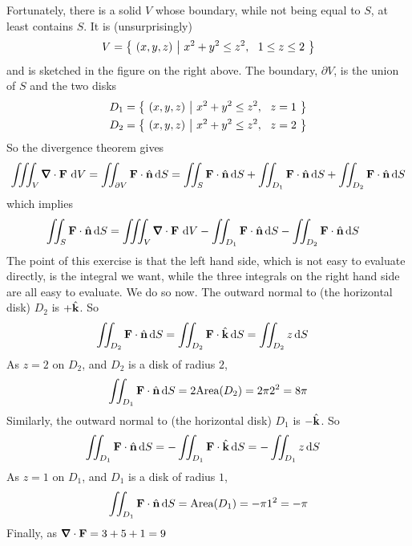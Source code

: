 \begin{eg}
{\begin{efig}
\end{efig}
}
Fortunately, there is a solid $V$ whose boundary, while not being equal to  
$S$, at least contains $S$. It is (unsurprisingly)
\begin{equation*}
V = \big\{ \ (x,y,z)\ \big|\ x^2+y^2\le z^2,\ \ 1\le z\le 2\ \big\}
\end{equation*}
and is sketched in the figure on the right above.
The boundary, $\partial V$, is the union of $S$ and the two disks
\begin{align*}
D_1 &= \big\{ \ (x,y,z)\ \big|\ x^2+y^2\le z^2,\ \ z=1\ \big\} \\
D_2 &= \big\{ \ (x,y,z)\ \big|\ x^2+y^2\le z^2,\ \ z=2\ \big\} 
\end{align*}
So the divergence theorem gives
\begin{align*}
\tripInt_V\vnabla\cdot\vF\ \dee{V} = \dblInt_{\partial V} \vF\cdot\hn\,\dee{S}
= \dblInt_S \vF\cdot\hn\,\dee{S}
 +\dblInt_{D_1} \vF\cdot\hn\,\dee{S}
 +\dblInt_{D_2} \vF\cdot\hn\,\dee{S}
\end{align*}
which implies
\begin{align*}
\dblInt_S \vF\cdot\hn\,\dee{S}
&= \tripInt_V\vnabla\cdot\vF\ \dee{V} 
  -\dblInt_{D_1} \vF\cdot\hn\,\dee{S}
 -\dblInt_{D_2} \vF\cdot\hn\,\dee{S}
\end{align*}
The point of this exercise is that the left hand side, which is not easy
to evaluate directly, is the integral we want, while the three
integrals on the right hand side are all easy to evaluate. We do so now.
The outward normal to (the horizontal disk) $D_2$ is $+\hat{\mathbf{k}}$. So
\begin{align*}
\iint_{D_2} \mathbf{F}\cdot\hat{\mathbf{n}}\,\mathrm{d}S
&=\iint_{D_2} \mathbf{F}\cdot\hat{\mathbf{k}}\,\mathrm{d}S
=\iint_{D_2} z\,\mathrm{d}S
\end{align*} 
As $z=2$ on $D_2$, and $D_2$ is a disk of radius $2$,
\begin{equation*}
\iint_{D_1} \mathbf{F}\cdot\hat{\mathbf{n}}\,\mathrm{d}S
=2\text{Area}(D_2)
=2\pi 2^2 = 8\pi
\end{equation*}
Similarly, the outward normal to (the horizontal disk) $D_1$ is $-\hat{\mathbf{k}}$. So
\begin{align*}
\iint_{D_1} \mathbf{F}\cdot\hat{\mathbf{n}}\,\mathrm{d}S
&=-\iint_{D_1} \mathbf{F}\cdot\hat{\mathbf{k}}\,\mathrm{d}S
=-\iint_{D_1} z\,\mathrm{d}S
\end{align*} 
As $z=1$ on $D_1$, and $D_1$ is a disk of radius $1$,
\begin{equation*}
\iint_{D_1} \mathbf{F}\cdot\hat{\mathbf{n}}\,\mathrm{d}S
=\text{Area}(D_1)
=-\pi 1^2 = -\pi
\end{equation*}
Finally, as $\vnabla\cdot\vF = 3+5+1 = 9$
\begin{align*}

\end{align*}
\end{eg}
